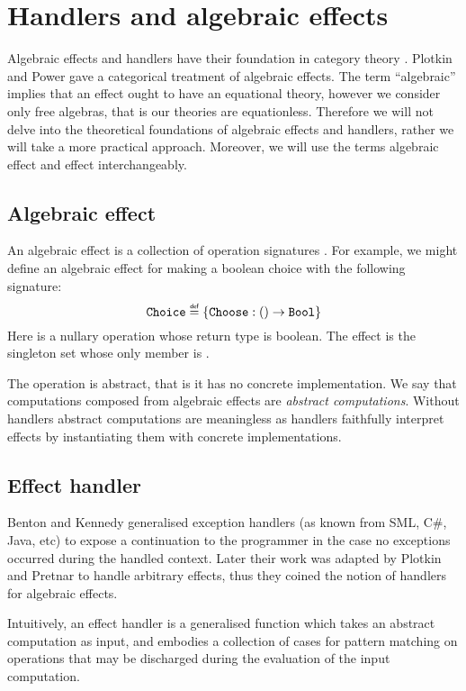 \section{Handlers and algebraic effects}
Algebraic effects and handlers have their foundation in category theory \cite{Plotkin2001a,Plotkin2013}. Plotkin and Power \cite{Plotkin2001b,Plotkin2001a} gave a categorical treatment of algebraic effects. The term ``algebraic'' implies that an effect ought to have an equational theory, however we consider only free algebras, that is our theories are equationless. Therefore we will not delve into the theoretical foundations of algebraic effects and handlers, rather we will take a more practical approach. Moreover, we will use the terms algebraic effect and effect interchangeably.

\subsection{Algebraic effect}
An algebraic effect is a collection of operation signatures \cite{Lindley2014}. For example, we might define an algebraic effect  for making a boolean choice with the following signature:
\[ \type{Choice} \defas \{ \type{Choose}: () \to \type{Bool} \} \]
Here  is a nullary operation whose return type is boolean. The effect  is the singleton set whose only member is . 

The operation  is abstract, that is it has no concrete implementation. We say that computations composed from algebraic effects are \emph{abstract computations}. Without handlers abstract computations are meaningless as handlers faithfully interpret effects by instantiating them with concrete implementations. 

\subsection{Effect handler}
Benton and Kennedy generalised exception handlers \cite{Benton2001} (as known from SML, C\#, Java, etc) to expose a continuation to the programmer in the case no exceptions occurred during the handled context. Later their work was adapted by Plotkin and Pretnar \cite{Plotkin2013} to handle arbitrary effects, thus they coined the notion of handlers for algebraic effects.

Intuitively, an effect handler is a generalised function which takes an abstract computation as input, and embodies a collection of cases for pattern matching on operations that may be discharged during the evaluation of the input computation.

